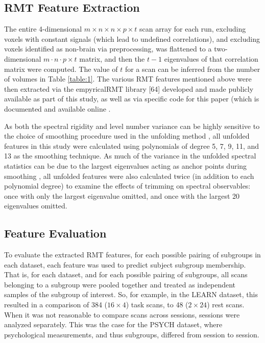\documentclass[NETN,manuscript]{stjour-new}
\begin{document}
\subsection{RMT Feature Extraction}
The entire 4-dimensional \(m \times n \times n \times p \times t\) scan array for each run,
excluding voxels with constant signals (which lead to undefined correlations), and excluding voxels
identified as non-brain via preprocessing, was flattened to a two-dimensional \(m \cdot n \cdot p
\times t\) matrix, and then the \(t - 1\) eigenvalues of that correlation matrix were computed. The
value of \(t\) for a scan can be inferred from the number of volumes in Table \ref{table:1}. The various RMT
features mentioned above were then extracted via the empyricalRMT library [64] developed and made
publicly available as part of this study, as well as via specific code for this paper (which is
documented and available online \citep{bergerderekm.DMBergerRandommatrixfmriV02020}.

As both the spectral rigidity and level number variance can be highly sensitive to the choice of
smoothing procedure used in the unfolding method
\citep{abul-magdUnfoldingSpectrumChaotic2014,moralesImprovedUnfoldingDetrending2011,abueleninSpectralUnfoldingChaotic2018,fossionRandommatrixSpectraTime2013,abueleninEffectUnfoldingSpectral2012},
all unfolded features in this study were calculated using polynomials of degree 5, 7, 9, 11, and 13
as the smoothing technique. As much of the variance in the unfolded spectral statistics can be due
to the largest eigenvalues acting as anchor points during smoothing
\citep{moralesImprovedUnfoldingDetrending2011,abueleninEffectUnfoldingSpectral2012}, all unfolded
features were also calculated twice (in addition to each polynomial degree) to examine the effects
of trimming on spectral observables: once with only the largest eigenvalue omitted, and once with
the largest 20 eigenvalues omitted.

\subsection{Feature Evaluation}
To evaluate the extracted RMT features, for each possible pairing of subgroups in each dataset, each
feature was used to predict subject subgroup membership. That is, for each dataset, and for each
possible pairing of subgroups, all scans belonging to a subgroup were pooled together and treated as
independent samples of the subgroup of interest. So, for example, in the LEARN dataset, this
resulted in a comparison of 384 (\(16 \times 4\)) task scans, to 48 (\(2 \times 24\)) rest scans. When it was not
reasonable to compare scans across sessions, sessions were analyzed separately. This was the case
for the PSYCH dataset, where psychological measurements, and thus subgroups, differed from session
to session.
\end{document}
